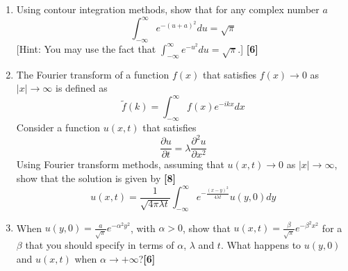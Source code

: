 \documentclass[a4paper]{article}
\begin{document}
\newpage
\begin{qns}\leavevmode
\begin{enumerate}[label=(\alph*)]
\item 
Using contour integration methods, show that for any complex number $a$
$$\int_{-\infty}^\infty e^{-(u+a)^2}du=\sqrt{\pi}$$
[Hint: You may use the fact that $\int_{-\infty}^\infty e^{-u^2}du=\sqrt{\pi}$.] \hfill\textbf{[6]}
\item The Fourier transform of a function $f(x)$ that satisfies $f(x)\rightarrow0$ as $|x|\rightarrow\infty$ is defined as
$$\tilde{f}(k)=\int_{-\infty}^\infty f(x)e^{-ikx}dx$$
Consider a function $u(x, t)$ that satisfies
$$\frac{\partial u}{\partial t}=\lambda\frac{\partial^2u}{\partial x^2}$$
Using Fourier transform methods, assuming that $u(x, t)\rightarrow 0$ as $|x|\rightarrow\infty$, show that the
solution is given by \hfill\textbf{[8]}
$$u(x,t)=\frac{1}{\sqrt{4\pi\lambda t}}\int_{-\infty}^\infty e^{-\frac{(x-y)^2}{4\lambda t}}u(y,0)dy$$
\item When $u(y,0)=\frac{a}{\sqrt{\pi}}e^{-\alpha^2y^2}$, with $\alpha>0$, show that $u(x,t)=\frac{\beta}{\sqrt{\pi}}e^{-\beta^2x^2}$ for a $\beta$ that you should specify in terms of $\alpha$, $\lambda$ and $t$. What happens to $u(y, 0)$ and $u(x, t)$ when $\alpha\rightarrow+\infty$?\hfill\textbf{[6]}
\end{enumerate}
\end{qns}
\end{document}
